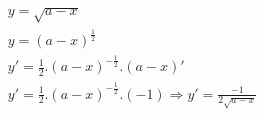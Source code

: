 \begin{ex}
\begin{align}
&y=\sqrt{a-x}\nonumber\\
&y=(a-x)^\frac{1}{2}\nonumber\\
&y'=\frac{1}{2}.(a-x)^{-\frac{1}{2}}.(a-x)'\nonumber\\
&y'=\frac{1}{2}.(a-x)^{-\frac{1}{2}}.(-1)\Rightarrow y'=\frac{-1}{2\sqrt{a-x}}\nonumber
\end{align}
\end{ex}